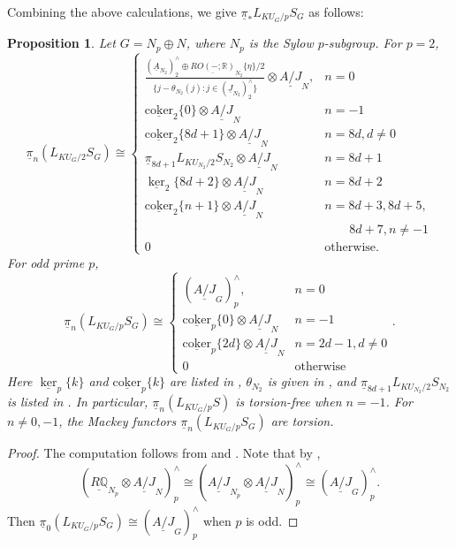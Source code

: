\documentclass{amsart}
\theoremstyle{plain}
\newtheorem{proposition}[theorem]{Proposition}
\theoremstyle{definition}
\theoremstyle{remark}
\begin{document}
Combining the above calculations, we give $\underline{\pi}_* L_{KU_G/p}S_G$ as follows:
\begin{proposition}\label{thm: Z graded homotopy of KU_G/p local sphere}
    Let $G = N_p \oplus N$, where $N_p$ is the Sylow $p$-subgroup. For $p=2$, 
    \[\underline{\pi}_n(L_{KU_G/2}S_G) \cong \begin{cases}
        \frac{(\underline{A}_{N_2})_2^\wedge \oplus \underline{RO(-;\mathbb{R})}_{N_2}\{\eta\}/2}{\{j-\theta_{N_2}(j):j\in (\underline{J}_{N_2})_2^\wedge\}} \otimes \underline{A/J}_N, & n=0\\
        \underline{\mathrm{coker}}_2\{0\}\otimes \underline{A/J}_N  & n=-1\\
        \underline{\mathrm{coker}}_2\{8d+1\}\otimes \underline{A/J}_N  & n=8d, d\neq 0\\
        \underline{\pi}_{8d+1} L_{KU_{N_2}/2}S_{N_2}\otimes \underline{A/J}_N & n=8d+1\\
        \underline{\ker}_2\{8d+2\}\otimes \underline{A/J}_N & n=8d+2\\
        \underline{\mathrm{coker}}_2\{n+1\}\otimes \underline{A/J}_N & n=8d+3, 8d+5,\\&\qquad 8d+7,n\neq -1\\
        0 & \text{otherwise}.
    \end{cases}\]
    For odd prime $p$, 
    \[
    \underline{\pi}_n(L_{KU_G/p}S_G) \cong \begin{cases}
        (\underline{A/J}_G)_p^\wedge, & n=0\\
        \underline{\mathrm{coker}}_p\{0\}\otimes \underline{A/J}_N  & n=-1\\
        \underline{\mathrm{coker}}_p\{2d\}\otimes \underline{A/J}_N  & n=2d-1, d\neq 0\\
        0 & \text{otherwise}
    \end{cases}.
    \]
    Here $\underline{\ker}_p\{k\}$ and $\underline{\mathrm{coker}}_p\{k\}$ are listed in , $\theta_{N_2}$ is given in , and $\underline{\pi}_{8d+1} L_{KU_{N_2}/2}S_{N_2}$ is listed in . In particular, $\underline{\pi}_n(L_{KU_G/p}S)$ is torsion-free when $n = -1$. For $n \neq 0, -1$, the Mackey functors $\underline{\pi}_n(L_{KU_G/p}S_G)$ are torsion. 
\end{proposition}
\begin{proof}
    The computation follows from  and . Note that by ,
    \[
    (\underline{R\mathbb{Q}}_{N_p}\otimes \underline{A/J}_N)_p^\wedge\cong (\underline{A/J}_{N_p}\otimes \underline{A/J}_N)_p^\wedge\cong (\underline{A/J}_G)_p^\wedge.
    \]
    Then $\underline{\pi}_0(L_{KU_G/p}S_G) \cong (\underline{A/J}_G)_p^\wedge$ when $p$ is odd.
\end{proof}
\end{document}
